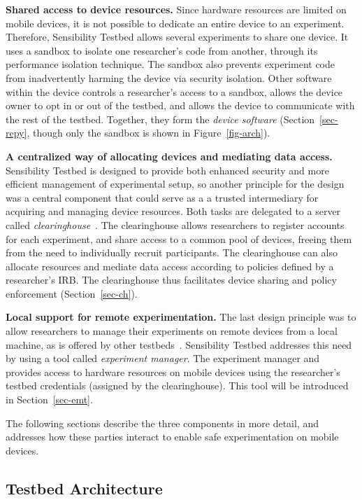 \textbf{Shared access to device resources.} 
Since hardware resources are limited on mobile devices, it is 
not possible to dedicate an entire device to an experiment. Therefore, 
Sensibility Testbed allows several experiments to share one device. It 
uses a sandbox to isolate one researcher's code from 
 another, through its performance isolation technique. The sandbox 
also prevents experiment code from inadvertently harming the device
via security isolation. Other software within the device controls a
researcher's access to a sandbox, allows the device 
owner to opt in or out of the testbed, and allows the device
to communicate with the rest of the testbed. Together, they form the
\textit{device software} (Section~\ref{sec-repy}, though only the 
sandbox is shown in Figure~\ref{fig-arch}).

\textbf{A centralized way of allocating devices and mediating data access.}
Sensibility Testbed is designed to provide both enhanced security and 
more efficient management of experimental setup, so another principle 
for the design was a central component that could serve as a a trusted 
intermediary for acquiring and managing device resources. Both tasks 
are delegated to  a server called \textit{clearinghouse}~\cite{ch}. The 
clearinghouse allows researchers to 
register accounts for each experiment, and share access to a common 
pool of devices, freeing them from the need to individually recruit participants. 
The clearinghouse can also allocate resources and mediate 
data access according to policies defined by a researcher's IRB. The 
clearinghouse thus facilitates device sharing and policy enforcement 
(Section~\ref{sec-ch}).

\textbf{Local support for remote experimentation.} 
The last design principle was to allow researchers to manage their 
experiments on remote devices from a local machine, as is offered 
by other testbeds~\cite{hibler2008large, peterson2006experiences}. Sensibility 
Testbed addresses this need by using a tool called \textit{experiment 
manager}. The experiment manager and provides access to 
hardware resources on mobile devices using the researcher's testbed 
credentials (assigned by the clearinghouse). This tool will be introduced
in Section~\ref{sec-emt}.

\smallskip
The following sections describe the three components in more detail, and 
addresses how these parties interact to enable safe experimentation on 
mobile devices. 


\subsection{Testbed Architecture}\label{sec-component}

